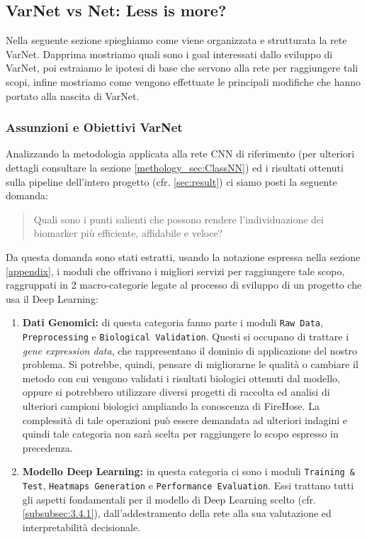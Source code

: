 \subsection{VarNet vs Net: Less is more?}
Nella seguente sezione spieghiamo come viene organizzata e strutturata la rete VarNet. Dapprima mostriamo quali sono i
goal interessati dallo sviluppo di VarNet, poi estraiamo le ipotesi di base che servono alla rete per
raggiungere tali scopi, infine mostriamo come vengono effettuate le principali modifiche che hanno portato alla nascita
di VarNet.

\subsubsection{Assunzioni e Obiettivi VarNet}
Analizzando la metodologia applicata alla rete CNN di riferimento (per ulteriori dettagli consultare la sezione
\ref{methology_sec:ClassNN}) ed i risultati ottenuti sulla pipeline dell'intero progetto (cfr. \ref{sec:result})
ci siamo posti la seguente domanda:
\begin{quote}
    Quali sono i punti salienti che possono rendere l'individuazione dei biomarker più efficiente, affidabile e veloce? 
\end{quote}
Da questa domanda sono stati estratti, usando la notazione espressa nella sezione \ref{appendix}, i moduli che offrivano
i migliori servizi per raggiungere tale scopo, raggruppati in 2 macro-categorie legate al processo di sviluppo di un
progetto che usa il Deep Learning:
\begin{enumerate}
    \item \textbf{Dati Genomici:} di questa categoria fanno parte i moduli \texttt{Raw Data}, \texttt{Preprocessing} e
    \texttt{Biological Validation}. Questi si occupano di trattare i \textit{gene expression data}, che rappresentano 
    il dominio di applicazione del nostro problema. Si potrebbe, quindi, pensare di migliorarne le qualità o 
    cambiare il metodo con cui vengono validati i risultati biologici ottenuti dal modello, oppure si potrebbero
    utilizzare diversi progetti di raccolta ed analisi di ulteriori campioni biologici ampliando la conoscenza di
    FireHose. La complessità di tale operazioni può essere demandata ad ulteriori indagini e quindi tale categoria 
    non sarà scelta per raggiungere lo scopo espresso in precedenza.
    \item \textbf{Modello Deep Learning:} in questa categoria ci sono i moduli \texttt{Training \& Test},
    \texttt{Heatmaps Generation} e \texttt{Performance Evaluation}. Essi trattano tutti gli aspetti fondamentali per 
    il modello di Deep Learning scelto (cfr. \ref{subsubsec:3.4.1}), dall'addestramento della rete alla sua valutazione
    ed interpretabilità decisionale. 
\end{enumerate}

